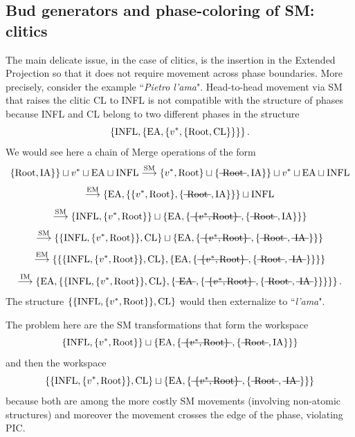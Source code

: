 \documentclass[12pt]{amsart}
\numberwithin{equation}{section}
\begin{document}
\smallskip
\subsection{Bud generators and phase-coloring of SM: clitics}\label{SMphasecolSec3}


The main delicate issue, in the case of clitics, is the insertion in the Extended Projection
so that it does not require movement across phase boundaries. More precisely, consider
the example ``{\em Pietro l'ama}". Head-to-head movement via SM that raises the clitic
CL to INFL is not compatible with the structure of phases because INFL and CL
belong to two different phases in the structure
$$ \{ {\rm INFL}, \{ {\rm EA}, \{ v^* , \{ {\rm Root}, {\rm CL} \} \} \} \} \, . $$
We would see here a chain of Merge operations of the form
$$  \{ {\rm Root}, {\rm IA} \} \}  \sqcup v^* \sqcup {\rm EA} \sqcup {\rm INFL} \stackrel{\rm SM}{\longrightarrow}
\{ v^*, {\rm Root} \} \sqcup \{ \text{\sout{ Root }}, {\rm IA} \} \}  \sqcup v^* \sqcup {\rm EA} \sqcup {\rm INFL} $$
$$  \stackrel{\rm EM}{\longrightarrow} \{ {\rm EA}, \{ \{ v^*, {\rm Root} \} , \{ \text{\sout{ Root }}, {\rm IA} \} \} \} \sqcup {\rm INFL}  $$
$$ \stackrel{\rm SM}{\longrightarrow} \{ {\rm INFL}, \{ v^*, {\rm Root} \}  \} \sqcup 
\{ {\rm EA}, \{ \text{\sout{ $\{ v^*, {\rm Root} \}$ }} , \{ \text{\sout{ Root }}, {\rm IA} \} \} \} $$
$$ \stackrel{\rm SM}{\longrightarrow} \{ \{ {\rm INFL}, \{ v^*, {\rm Root} \}  \}, {\rm CL} \} \sqcup 
\{ {\rm EA}, \{ \text{\sout{ $\{ v^*, {\rm Root} \}$ }} , \{ \text{\sout{ Root }}, \text{\sout{  IA }} \} \} \} $$
$$ \stackrel{\rm EM}{\longrightarrow} \{ \{ \{ {\rm INFL}, \{ v^*, {\rm Root} \}  \}, {\rm CL} \} , \{ {\rm EA}, \{ \text{\sout{ $\{ v^*, {\rm Root} \}$ }} , \{ \text{\sout{ Root }}, \text{\sout{  IA }} \} \} \} \} $$
$$ \stackrel{\rm IM}{\longrightarrow} \{ {\rm EA},  \{ \{ {\rm INFL}, \{ v^*, {\rm Root} \}  \}, {\rm CL} \}  , \{ \text{\sout{ EA }}, \{ \text{\sout{ $\{ v^*, {\rm Root} \}$ }} , \{ \text{\sout{ Root }}, \text{\sout{  IA }} \} \} \} \} \} \, . $$
The structure $ \{ \{ {\rm INFL}, \{ v^*, {\rm Root} \}  \}, {\rm CL} \}$ would then externalize to ``{\em l'ama}".

The problem here are the SM transformations that form the workspace
$$ \{ {\rm INFL}, \{ v^*, {\rm Root} \}  \} \sqcup \{ {\rm EA}, \{ \text{\sout{ $\{ v^*, {\rm Root} \}$ }} , 
\{ \text{\sout{ Root }}, {\rm IA} \} \} \} $$
and then the workspace
$$ \{ \{ {\rm INFL}, \{ v^*, {\rm Root} \}  \}, {\rm CL} \} \sqcup 
\{ {\rm EA}, \{ \text{\sout{ $\{ v^*, {\rm Root} \}$ }} , \{ \text{\sout{ Root }}, \text{\sout{  IA }} \} \} \} $$ 
because both are among the more costly SM movements (involving non-atomic structures) and
moreover the movement crosses the edge of the phase, violating PIC. 
\end{document}
